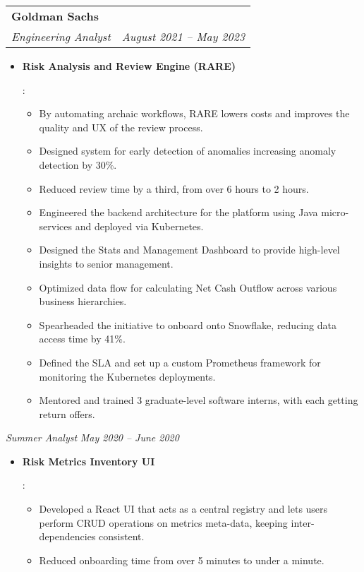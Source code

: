 \documentclass[letterpaper,11pt]{article}
\makeatletter
\newcommand{\resumeItem}[2]{
  \item\small{
    \textbf{#1}{: #2 \vspace{-2pt}}
  }
}
\newcommand{\resumeSubheading}[4]{
  \vspace{-1pt}\item
    \begin{tabular*}{0.97\textwidth}[t]{l@{\extracolsep{\fill}}r}
      \textbf{#1} & #2 \\
      \textit{\small#3} & \textit{\small #4} \\
    \end{tabular*}\vspace{-5pt}
}
\newcommand{\resumeSubSubHeading}[2]{\textit{\small #1} \hfill \textit{\small #2} }
\newcommand{\resumeItemListStart}{\begin{itemize}}
\newcommand{\resumeItemListEnd}{\end{itemize}\vspace{-5pt}}
\makeatother
\begin{document}
    \resumeSubheading
    {Goldman Sachs}{}
    {Engineering Analyst}{August 2021 -- May 2023}
    \resumeItemListStart
    \resumeItem{Risk Analysis and Review Engine (RARE)}
        {
        \begin{itemize}
        \item By automating archaic workflows, RARE lowers costs and improves the quality and UX of the review process.
        \item Designed system for early detection of anomalies increasing anomaly detection by 30\%.
        \item Reduced review time by a third, from over 6 hours to 2 hours.
        \item Engineered the backend architecture for the platform using  Java micro-services and deployed via Kubernetes.
        \item Designed the Stats and Management Dashboard to provide high-level insights to senior management.
        \item Optimized data flow for calculating Net Cash Outflow across various business hierarchies.
        \item Spearheaded the initiative to onboard onto Snowflake, reducing data access time by 41\%. 
        \item Defined the SLA and set up a custom Prometheus framework for monitoring the Kubernetes deployments.
        \item Mentored and trained 3 graduate-level software interns, with each getting return offers. 
        \end{itemize}
        }
    \resumeItemListEnd
    
    \resumeSubSubHeading {Summer Analyst}{May 2020 -- June 2020}
    \resumeItemListStart
    \resumeItem{Risk Metrics Inventory UI}
        {
          \begin{itemize}
          \item Developed a React UI that acts as a central registry and lets users perform CRUD operations on metrics meta-data, keeping inter-dependencies consistent.
          \item Reduced onboarding time from over 5 minutes to under a minute.
          \end{itemize}
        }
    \resumeItemListEnd
\end{document}
